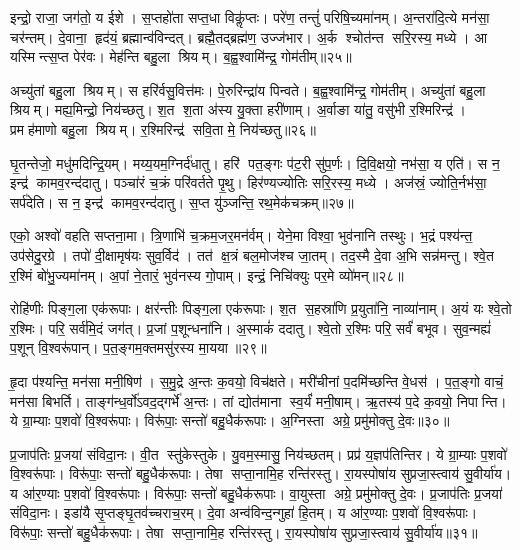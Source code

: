 इन्द्रो॒ राजा॒ जग॑तो॒ य ईशे। स॒प्तहो॑ता सप्त॒धा विकॢ॑प्तः। परे॑ण॒ तन्तुं॑ परिषि॒च्यमा॑नम्। अ॒न्तरा॑दि॒त्ये मन॑सा॒ चर॑न्तम्। दे॒वाना॒ हृद॑यं॒ ब्रह्मान्व॑विन्दत्। ब्रह्मै॒तद्ब्रह्म॑ण॒ उज्ज॑भार। अ॒र्क श्चोत॑न्त सरि॒रस्य॒ मध्ये। आ यस्मिन्त्स॒प्त पेर॑वः। मेह॑न्ति बहु॒ला श्रियम्। ब॒ह्व॒श्वामि॑न्द्र॒ गोम॑तीम्॥२५॥%

अच्यु॑तां बहु॒ला श्रियम्। स हरि॑र्वसु॒वित्त॑मः। पे॒रुरिन्द्रा॑य पिन्वते। ब॒ह्व॒श्वामि॑न्द्र॒ गोम॑तीम्। अच्यु॑तां बहु॒ला श्रियम्। मह्य॒मिन्द्रो॒ निय॑च्छतु। श॒त श॒ता अ॑स्य यु॒क्ता हरी॑णाम्। अ॒र्वाङा या॑तु॒ वसु॑भी र॒श्मिरिन्द्र॑। प्रमह॑माणो बहु॒ला श्रियम्। र॒श्मिरिन्द्र॑ सवि॒ता मे॒ निय॑च्छतु॥२६॥%

घृ॒तन्तेजो॒ मधु॑मदिन्द्रि॒यम्। मय्य॒यम॒ग्निर्द॑धातु। हरि॑ पत॒ङ्गः प॑ट॒री सु॑प॒र्णः। दि॒वि॒क्षयो॒ नभ॑सा॒ य एति॑। स न॒ इन्द्र॑ कामव॒रन्द॑दातु। पञ्चा॑रं च॒क्रं परि॑वर्तते पृ॒थु। हिर॑ण्यज्योतिः सरि॒रस्य॒ मध्ये। अज॑स्रं॒ ज्योति॒र्नभ॑सा॒ सर्प॑देति। स न॒ इन्द्र॑ कामव॒रन्द॑दातु। स॒प्त यु॑ञ्जन्ति॒ रथ॒मेक॑चक्रम्॥२७॥%

एको॒ अश्वो॑ वहति सप्तना॒मा। त्रि॒णाभि॑ च॒क्रम॒जर॒मन॑र्वम्। येने॒मा विश्वा॒ भुव॑नानि तस्थुः। भ॒द्रं पश्य॑न्त॒ उप॑सेदु॒रग्रे। तपो॑ दी॒क्षामृष॑यः सुव॒र्विद॑। तत॑ क्ष॒त्रं बल॒मोज॑श्च जा॒तम्। तद॒स्मै दे॒वा अ॒भि सन्न॑मन्तु। श्वे॒त र॒श्मिं बो॑भु॒ज्यमा॑नम्। अ॒पां ने॒तारं॒ भुव॑नस्य गो॒पाम्। इन्द्रं॒ निचि॑क्युः पर॒मे व्यो॑मन्॥२८॥

रोहि॑णीः पिङ्ग॒ला एक॑रूपाः। क्षर॑न्तीः पिङ्ग॒ला एक॑रूपाः। श॒त स॒हस्रा॑णि प्र॒युता॑नि॒ नाव्या॑नाम्। अ॒यं यः श्वे॒तो र॒श्मिः। परि॒ सर्व॑मि॒दं जग॑त्। प्र॒जां प॒शून्धना॑नि। अ॒स्माकं॑ ददातु। श्वे॒तो र॒श्मिः परि॒ सर्वं॑ बभूव। सुव॒न्मह्यं॑ प॒शून् वि॒श्वरू॑पान्। प॒त॒ङ्गम॒क्तमसु॑रस्य मा॒यया॥२९॥%

हृ॒दा प॑श्यन्ति॒ मन॑सा मनी॒षिण॑। स॒मु॒द्रे अ॒न्तः क॒वयो॒ विच॑क्षते। मरी॑चीनां प॒दमि॑च्छन्ति वे॒धस॑। प॒त॒ङ्गो वाचं॒ मन॑सा बिभर्ति। ताङ्ग॑न्ध॒र्वो॑ऽवद॒द्गर्भे॑ अ॒न्तः। तां द्योत॑माना स्व॒र्यं॑ मनी॒षाम्। ऋ॒तस्य॑ प॒दे क॒वयो॒ निपान्ति। ये ग्रा॒म्याः प॒शवो॑ वि॒श्वरू॑पाः। विरू॑पाः॒ सन्तो॑ बहु॒धैक॑रूपाः। अ॒ग्निस्ता अग्रे॒ प्रमु॑मोक्तु दे॒वः॥३०॥

प्र॒जाप॑तिः प्र॒जया॑ संविदा॒नः। वी॒त स्तु॑केस्तुके। यु॒वम॒स्मासु॒ निय॑च्छतम्। प्रप्र॑ य॒ज्ञप॑तिन्तिर। ये ग्रा॒म्याः प॒शवो॑ वि॒श्वरू॑पाः। विरू॑पाः॒ सन्तो॑ बहु॒धैक॑रूपाः। तेषा सप्ता॒नामि॒ह रन्ति॑रस्तु। रा॒यस्पोषा॑य सुप्रजा॒स्त्वाय॑ सु॒वीर्या॑य। य आ॑र॒ण्याः प॒शवो॑ वि॒श्वरू॑पाः। विरू॑पाः॒ सन्तो॑ बहु॒धैक॑रूपाः। वा॒युस्ता अग्रे॒ प्रमु॑मोक्तु दे॒वः। प्र॒जाप॑तिः प्र॒जया॑ संविदा॒नः। इडा॑यै सृ॒प्तङ्घृ॒तव॑च्चराच॒रम्। दे॒वा अन्व॑विन्द॒न्गुहा॑ हि॒तम्। य आ॑र॒ण्याः प॒शवो॑ वि॒श्वरू॑पाः। विरू॑पाः॒ सन्तो॑ बहु॒धैक॑रूपाः। तेषा सप्ता॒नामि॒ह रन्ति॑रस्तु। रा॒यस्पोषा॑य सुप्रजा॒स्त्वाय॑ सु॒वीर्या॑य॥३१॥
\anuvakamend[आ॒त्मा जना॑नां  विकु॒र्वन्तं॑  विप॒श्चिं प्र॒जानां वसु॒धानीं  वि॒राजं॒ चर॑न्तं॒  गोम॑तीं मे॒ निय॑च्छ॒त्वेक॑चक्र॒व्व्योँ॑मन्मा॒यया॑ दे॒व एक॑रूपा अ॒ष्टौ च॑]


